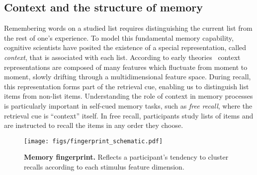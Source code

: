 \subsection*{Context and the structure of memory}
Remembering words on a studied list requires distinguishing the current list from the rest of one's experience.  To model this fundamental memory capability, cognitive scientists have posited the existence of a special representation, called \emph{context}, that is associated with each list.  According to early theories~\citep[e.g.][]{Este55a,AndeBowe72} context representations are composed of many features which fluctuate from moment to moment, slowly drifting through a multidimensional feature space.  During recall, this representation forms part of the retrieval cue, enabling us to distinguish list items from non-list items.  Understanding the role of context in memory processes is particularly important in self-cued memory tasks, such as \textit{free recall}, where the retrieval cue is ``context'' itself.  In free recall, participants study lists of items and are instructed to recall the items in any order they choose.

\begin{wrapfigure}[10]{r}{1.3in}
  \begin{center}
    \vspace{-33pt}
    \texttt{[image: figs/fingerprint\_schematic.pdf]}
  \end{center}
  \vspace{-18pt}
  \caption{\footnotesize \textbf{Memory fingerprint.}  Reflects a participant's tendency to cluster recalls according to each stimulus feature dimension.}
  \label{fig:fingerprint}
\end{wrapfigure}

